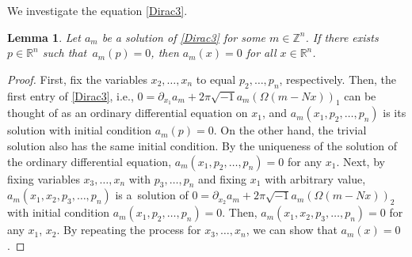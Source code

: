 \documentclass[pdftex]{sigma}
\numberwithin{equation}{section}
\newtheorem{Lemma}[Theorem]{Lemma}
\newcommand{\R}{\mathbb{R}}
\newcommand{\Z}{\mathbb{Z}}
\begin{document}
We investigate the equation \eqref{Dirac3}.
\begin{Lemma}
Let $a_m$ be a solution of \eqref{Dirac3} for some $m\in \Z^n$. If there exists $p\in \R^n$ such that~${a_m(p)=0}$, then $a_m(x)=0$ for all $x\in \R^n$.
\end{Lemma}
\begin{proof}
First, fix the variables $x_2, \ldots, x_n$ to equal $p_2, \ldots ,p_n$, respectively. Then, the first entry of \eqref{Dirac3}, i.e., $0=\partial_{x_1}a_m+2\pi\sqrt{-1}a_m(\Omega(m-Nx))_1$ can be thought of as an ordinary differential equation on $x_1$, and $a_m(x_1, p_2,\ldots ,p_n)$ is its solution with initial condition $a_m(p)=0$. On the other hand, the trivial solution also has the same initial condition. By the uniqueness of the solution of the ordinary differential equation, $a_m(x_1, p_2,\ldots ,p_n)=0$ for any $x_1$. Next, by fixing variables $x_3, \ldots, x_n$ with $p_3, \ldots ,p_n$ and fixing $x_1$ with arbitrary value, $a_m(x_1, x_2, p_3,\ldots ,p_n)$ is a~solution of $0=\partial_{x_2}a_m+2\pi\sqrt{-1}a_m(\Omega(m-Nx))_2$ with initial condition $a_m(x_1, p_2,\ldots ,p_n)=0$. Then, $a_m(x_1, x_2,p_3, \ldots ,p_n)=0$ for any $x_1$, $x_2$. By repeating the process for $x_3, \ldots ,x_n$, we can show that $a_m(x)=0$.
\end{proof}
\end{document}
